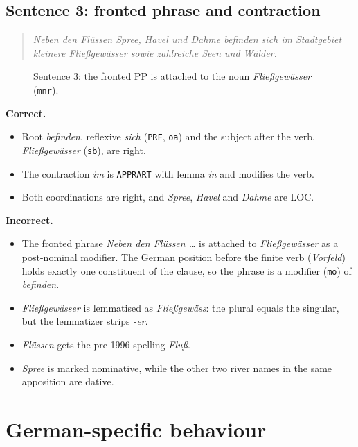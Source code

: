 \documentclass[11pt,a4paper]{article}
\newcommand{\code}[1]{\texttt{#1}}
\newcommand{\de}[1]{\textit{#1}}
\begin{document}
\subsection{Sentence 3: fronted phrase and contraction}
\begin{quote}\de{Neben den Flüssen Spree, Havel und Dahme befinden sich im Stadtgebiet kleinere Fließgewässer sowie zahlreiche Seen und Wälder.}\end{quote}
\begin{figure}[h]\centering

\caption{Sentence 3: the fronted PP is attached to the noun \de{Fließgewässer} (\code{mnr}).}\label{fig:s3}
\end{figure}
\textbf{Correct.}
\begin{itemize}
  \item Root \de{befinden}, reflexive \de{sich} (\code{PRF}, \code{oa}) and the subject after the verb, \de{Fließgewässer} (\code{sb}), are right.
  \item The contraction \de{im} is \code{APPRART} with lemma \de{in} and modifies the verb.
  \item Both coordinations are right, and \de{Spree}, \de{Havel} and \de{Dahme} are LOC.
\end{itemize}
\textbf{Incorrect.}
\begin{itemize}
  \item The fronted phrase \de{Neben den Flüssen …} is attached to \de{Fließgewässer} as a post-nominal modifier. The German position before the finite verb (\emph{Vorfeld}) holds exactly one constituent of the clause, so the phrase is a modifier (\code{mo}) of \de{befinden}.
  \item \de{Fließgewässer} is lemmatised as \de{Fließgewäss}: the plural equals the singular, but the lemmatizer strips \de{-er}.
  \item \de{Flüssen} gets the pre-1996 spelling \de{Fluß}.
  \item \de{Spree} is marked nominative, while the other two river names in the same apposition are dative.
\end{itemize}

\begin{table}[h]\centering\footnotesize
\caption{Token table of sentence 3 (tables for sentences 1 and 2 are in the notebook).}

\end{table}

\section{German-specific behaviour}\label{sec:german}
\end{document}
